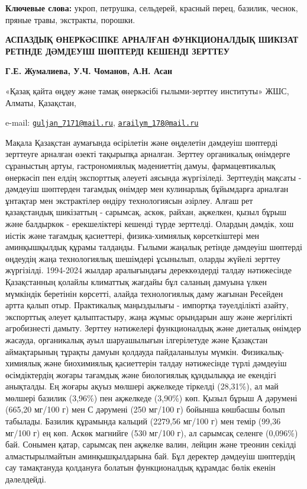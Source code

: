 {\bfseries Ключевые слова:} укроп, петрушка, сельдерей, красный перец,
базилик, чеснок, пряные травы, экстракты, порошки.

\begin{articleheader}
{\bfseries АСПАЗДЫҚ ӨНЕРКӘСІПКЕ АРНАЛҒАН ФУНКЦИОНАЛДЫҚ ШИКІЗАТ РЕТІНДЕ
ДӘМДЕУІШ ШӨПТЕРДІ КЕШЕНДІ ЗЕРТТЕУ}

{\bfseries
Г.Е. Жумалиева\textsuperscript{\envelope },
У.Ч. Чоманов,
А.Н. Асан\textsuperscript{\envelope }
}
\end{articleheader}

\begin{affiliation}
«Қазақ қайта өңдеу және тамақ өнеркәсібі ғылыми-зерттеу институты» ЖШС,
Алматы, Қазақстан,

e-mail:
\href{mailto:guljan_7171@mail.ru}{\nolinkurl{guljan\_7171@mail.ru}},
\href{mailto:arailym_178@mail.ru}{\nolinkurl{arailym\_178@mail.ru}}
\end{affiliation}

Мақала Қазақстан аумағында өсірілетін және өңделетін дәмдеуіш шөптерді
зерттеуге арналған өзекті тақырыпқа арналған. Зерттеу органикалық
өнімдерге сұраныстың артуы, гастрономиялық мәдениеттің дамуы,
фармацевтикалық өнеркәсіп пен елдің экспорттық әлеуеті аясында
жүргізіледі. Зерттеудің мақсаты - дәмдеуіш шөптерден тағамдық өнімдер
мен кулинарлық бұйымдарға арналған ұнтақтар мен экстрактілер өндіру
технологиясын әзірлеу. Алғаш рет қазақстандық шикізаттың - сарымсақ,
аскөк, райхан, ақжелкен, қызыл бұрыш және балдыркөк - ерекшеліктері
кешенді түрде зерттелді. Олардың дәмдік, хош иістік және тағамдық
қасиеттері, физика-химиялық көрсеткіштері мен аминқышқылдық құрамы
талданды. Ғылыми жаңалық ретінде дәмдеуіш шөптерді өңдеудің жаңа
технологиялық шешімдері ұсынылып, оларды жүйелі зерттеу жүргізілді.
1994-2024 жылдар аралығындағы дереккөздерді талдау нәтижесінде
Қазақстанның қолайлы климаттық жағдайы бұл саланың дамуына үлкен
мүмкіндік беретінін көрсетті, алайда технологиялық даму жағынан Ресейден
артта қалып отыр. Практикалық маңыздылығы - импортқа тәуелділікті
азайту, экспорттық әлеует қалыптастыру, жаңа жұмыс орындарын ашу және
жергілікті агробизнесті дамыту. Зерттеу нәтижелері функционалдық және
диеталық өнімдер жасауда, органикалық ауыл шаруашылығын ілгерілетуде
және Қазақстан аймақтарының тұрақты дамуын қолдауда пайдаланылуы мүмкін.
Физикалық-химиялық және биохимиялық қасиеттерін талдау нәтижесінде түрлі
дәмдеуіш өсімдіктердің жоғары тағамдық және биологиялық құндылыққа ие
екендігі анықталды. Ең жоғары ақуыз мөлшері ақжелкеде тіркелді
(28,31\%), ал май мөлшері базилик (3,96\%) пен ақжелкеде (3,90\%) көп.
Қызыл бұрыш А дәрумені (665,20 мг/100 г) мен С дәрумені (250 мг/100 г)
бойынша көшбасшы болып табылады. Базилик құрамында кальций (2279,56
мг/100 г) мен темір (99,36 мг/100 г) ең көп. Аскөк магнийге (530 мг/100
г), ал сарымсақ селенге (0,096\%) бай. Сонымен қатар, сарымсақ пен
ақжелке валин, лейцин және треонин секілді алмастырылмайтын
аминқышқылдарына бай. Бұл деректер дәмдеуіш шөптердің сау тамақтануда
қолдануға болатын функционалдық құрамдас бөлік екенін дәлелдейді.

